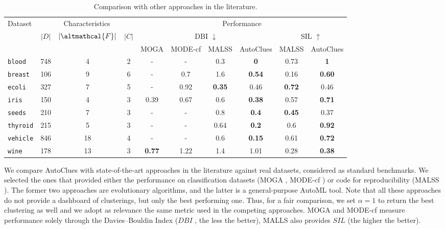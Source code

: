 \begin{table}[t]
    \centering
    \begin{tabular}{l|ccc|cccc|cc}
    \hline
        \multirow{3}{*}{Dataset} & \multicolumn{3}{c|}{Characteristics} & \multicolumn{6}{c}{Performance} \\
        & \multirow{2}{*}{$|D|$} & \multirow{2}{*}{$|\altmathcal{F}|$} & \multirow{2}{*}{$|C|$} & \multicolumn{4}{c|}{DBI $\downarrow$} & \multicolumn{2}{c}{SIL $\uparrow$} \\
        & & & & \multicolumn{1}{c}{MOGA} & \multicolumn{1}{c}{MODE-cf} & \multicolumn{1}{c}{MALSS} & \multicolumn{1}{c|}{AutoClues} & \multicolumn{1}{c}{MALSS} & \multicolumn{1}{c}{AutoClues} \\ \hline
        \texttt{blood} & 748 & 4 & 2 & - & - & 0.3 & \textbf{0} & 0.73 & \textbf{1} \\ 
        \texttt{breast} & 106 & 9 & 6 & - & 0.7 & 1.6 & \textbf{0.54} & 0.16 & \textbf{0.60} \\ 
        \texttt{ecoli} & 327 & 7 & 5 & - & 0.92 & \textbf{0.35} & 0.46 & \textbf{0.72} & 0.46 \\ 
        \texttt{iris} & 150 & 4 & 3 & 0.39 & 0.67 & 0.6 & \textbf{0.38} & 0.57 & \textbf{0.71} \\
        \texttt{seeds} & 210 & 7 & 3 & - & - & 0.8 & \textbf{0.4} & \textbf{0.45} & 0.37 \\
        \texttt{thyroid} & 215 & 5 & 3 & - & - & 0.64 & \textbf{0.2} & 0.6 & \textbf{0.92} \\ 
        \texttt{vehicle} & 846 & 18 & 4 & - & - & 0.6 & \textbf{0.15} & 0.61 & \textbf{0.72} \\ 
        \texttt{wine} & 178 & 13 & 3 & \textbf{0.77} & 1.22 & 1.4 & 1.01 & 0.28 & \textbf{0.38} \\ \hline
    \end{tabular}
    \vspace{0.2cm}
    \caption{Comparison with other approaches in the literature.}
    \label{clustering-tbl:comparison}
\end{table}


We compare AutoClues with state-of-the-art approaches in the literature against real datasets, considered as standard benchmarks.
We selected the ones that provided either the performance on classification datasets (MOGA \cite{dutta2013}, MODE-cf \cite{hancer2020new}) or code for reproducibility (MALSS \cite{Kamoshida2020}).
The former two approaches are evolutionary algorithms, and the latter is a general-purpose AutoML tool.
Note that all these approaches do not provide a dashboard of clusterings, but only the best performing one.
Thus, for a fair comparison, we set $\alpha=1$ to return the best clustering as well and we adopt as relevance the same metric used in the competing approaches.
MOGA and MODE-cf measure performance solely through the Davies–Bouldin Index ($DBI$ \cite{dbi}, the less the better),
MALLS also provides $SIL$ (the higher the better).

